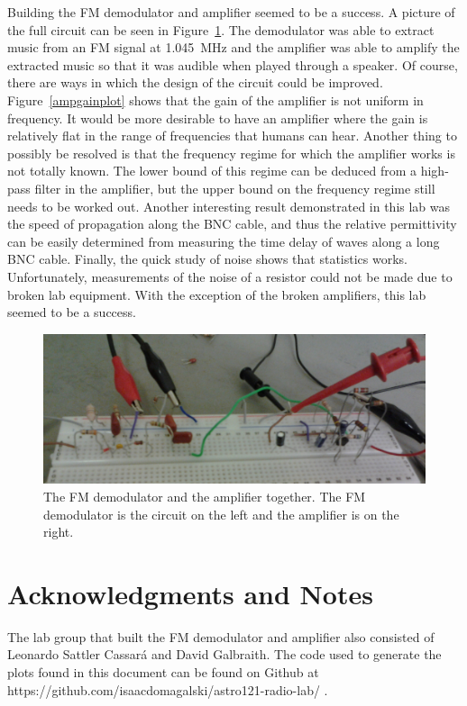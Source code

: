 \documentclass[11pt,letterpaper]{article}
\begin{document}
Building the FM demodulator and amplifier seemed to be a success. A picture of
the full circuit can be seen in Figure~\ref{everything}. The demodulator was
able to extract music from an FM signal at \SI{1.045}{\mega\hertz} and the
amplifier was able to amplify the extracted music so that it was audible when
played through a speaker. Of course, there are ways in which the design of the
circuit could be improved. Figure~\ref{ampgainplot} shows that the gain of the
amplifier is not uniform in frequency. It would be more desirable to have an
amplifier where the gain is relatively flat in the range of frequencies that
humans can hear. Another thing to possibly be resolved is that the frequency
regime for which the amplifier works is not totally known. The lower bound of
this regime can be deduced from a high-pass filter in the amplifier, but the
upper bound on the frequency regime still needs to be worked out. Another
interesting result demonstrated in this lab was the speed of propagation along
the BNC cable, and thus the relative permittivity can be easily determined from
measuring the time delay of waves along a long BNC cable. Finally, the quick
study of noise shows that statistics works. Unfortunately, measurements of the
noise of a resistor could not be made due to broken lab equipment. With the
exception of the broken amplifiers, this lab seemed to be a success.

\begin{figure}
    \centering
    \includegraphics[width=\textwidth]{figures/fullcircuit.jpg}
    \caption{The FM demodulator and the amplifier together. The FM demodulator
    is the circuit on the left and the amplifier is on the right.}
    \label{everything}
\end{figure}

\section{Acknowledgments and Notes}

The lab group that built the FM demodulator and amplifier also consisted of
Leonardo Sattler Cassar\'{a} and David Galbraith. The code used to generate the
plots found in this document can be found on Github at 
https://github.com/isaacdomagalski/astro121-radio-lab/ \cite{Github}.

\newpage

{}
\end{document}
